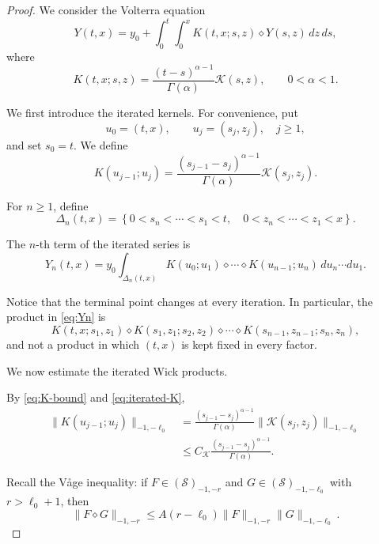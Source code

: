 \documentclass[10pt,a4paper]{amsart}
\begin{document}
\begin{proof}
We consider the Volterra equation
\begin{equation}
Y(t,x)
=
y_0+
\int_0^t\int_0^x
K(t,x;s,z)\diamond Y(s,z)\,dz\,ds,
\label{eq:Volterra}
\end{equation}
where
\begin{equation}
K(t,x;s,z)
=
\frac{(t-s)^{\alpha-1}}{\Gamma(\alpha)}
\mathcal K(s,z),
\qquad 0<\alpha<1.
\label{eq:K-definition}
\end{equation}

We first introduce the iterated kernels. For convenience, put
\[
u_0=(t,x),\qquad
u_j=(s_j,z_j),\quad j\geq1,
\]
and set $s_0=t$. We define
\begin{equation}
K(u_{j-1};u_j)
=
\frac{(s_{j-1}-s_j)^{\alpha-1}}
{\Gamma(\alpha)}
\mathcal K(s_j,z_j).
\label{eq:iterated-K}
\end{equation}

For $n\geq1$, define
\begin{equation}
\Delta_n(t,x)
=
\left\{
0<s_n<\cdots<s_1<t,\quad
0<z_n<\cdots<z_1<x
\right\}.
\label{eq:Delta}
\end{equation}

The $n$-th term of the iterated series is
\begin{equation}
Y_n(t,x)
=
y_0
\int_{\Delta_n(t,x)}
K(u_0;u_1)\diamond\cdots\diamond
K(u_{n-1};u_n)
\,du_n\cdots du_1.
\label{eq:Yn}
\end{equation}

Notice that the terminal point changes at every iteration. In particular,
the product in \eqref{eq:Yn} is
\[
K(t,x;s_1,z_1)
\diamond
K(s_1,z_1;s_2,z_2)
\diamond\cdots\diamond
K(s_{n-1},z_{n-1};s_n,z_n),
\]
and not a product in which $(t,x)$ is kept fixed in every factor.

We now estimate the iterated Wick products.

By \eqref{eq:K-bound} and \eqref{eq:iterated-K},
\begin{equation}
\begin{aligned}
\|K(u_{j-1};u_j)\|_{-1,-\ell_0}
&=
\frac{(s_{j-1}-s_j)^{\alpha-1}}
{\Gamma(\alpha)}
\|\mathcal K(s_j,z_j)\|_{-1,-\ell_0}
\\
&\leq
C_{\mathcal K}
\frac{(s_{j-1}-s_j)^{\alpha-1}}
{\Gamma(\alpha)}.
\end{aligned}
\label{eq:K-factor-estimate}
\end{equation}

Recall the Våge inequality: if
$F\in(\mathcal S)_{-1,-r}$ and
$G\in(\mathcal S)_{-1,-\ell_0}$ with
$r>\ell_0+1$, then
\begin{equation}
\|F\diamond G\|_{-1,-r}
\leq
A(r-\ell_0)
\|F\|_{-1,-r}
\|G\|_{-1,-\ell_0}.
\label{eq:Vage}
\end{equation}


\end{proof}
\end{document}
